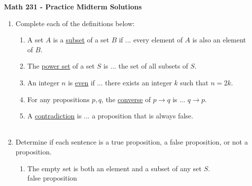 \documentclass[12pt]{amsart}
\theoremstyle{definition}
\theoremstyle{remark}
\begin{document}
\thispagestyle{empty}


\begin{huge}


\textbf{Math 231 - Practice Midterm Solutions}

\end{huge}

\vspace{1cm}

\begin{enumerate}



\item Complete each of the definitions below:

\begin{enumerate}

\item  A set $A$ is a \underline{subset} of a set $B$ if ... {\color{red} every element of $A$ is also an element of $B$. }  \\

\item  The \underline{power set} of a set $S$ is ...   {\color{red} the set of all subsets of $S$. } \\

\item  An integer $n$ is \underline{even} if ... {\color{red} there exists an integer $k$ such that $n=2k$.}\\

\item For any propositions $p,q$, the \underline{converse} of $p\rightarrow q$ is ...{\color{red} $q\rightarrow p$.} \\

\item  A \underline{contradiction} is ... {\color{red} a proposition that is always false.}\\ \\

\end{enumerate}


\item Determine if each sentence is a true proposition, a false proposition, or not a proposition.


	\begin{enumerate}
		\item The empty set is both an element and a subset of any set $S$.\\ {\color{red} false proposition}\\


\end{enumerate}
\end{enumerate}
\end{document}
